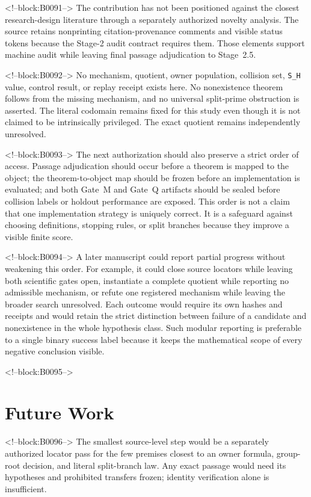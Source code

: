 \documentclass[11pt,a4paper]{article}
\begin{document}
<!--block:B0091-->
The contribution has not been positioned against the closest research-design literature through a separately authorized novelty analysis. The source retains nonprinting citation-provenance comments and visible status tokens because the Stage-2 audit contract requires them. Those elements support machine audit while leaving final passage adjudication to Stage~2.5.

<!--block:B0092-->
No mechanism, quotient, owner population, collision set, \texttt{S\_H} value, control result, or replay receipt exists here. No nonexistence theorem follows from the missing mechanism, and no universal split-prime obstruction is asserted. The literal codomain remains fixed for this study even though it is not claimed to be intrinsically privileged. The exact quotient remains independently unresolved.

<!--block:B0093-->
The next authorization should also preserve a strict order of access. Passage adjudication should occur before a theorem is mapped to the object; the theorem-to-object map should be frozen before an implementation is evaluated; and both Gate~M and Gate~Q artifacts should be sealed before collision labels or holdout performance are exposed. This order is not a claim that one implementation strategy is uniquely correct. It is a safeguard against choosing definitions, stopping rules, or split branches because they improve a visible finite score.

<!--block:B0094-->
A later manuscript could report partial progress without weakening this order. For example, it could close source locators while leaving both scientific gates open, instantiate a complete quotient while reporting no admissible mechanism, or refute one registered mechanism while leaving the broader search unresolved. Each outcome would require its own hashes and receipts and would retain the strict distinction between failure of a candidate and nonexistence in the whole hypothesis class. Such modular reporting is preferable to a single binary success label because it keeps the mathematical scope of every negative conclusion visible.

<!--block:B0095-->
\section{Future Work}

<!--block:B0096-->
The smallest source-level step would be a separately authorized locator pass for the few premises closest to an owner formula, group-root decision, and literal split-branch law. Any exact passage would need its hypotheses and prohibited transfers frozen; identity verification alone is insufficient.
\end{document}
